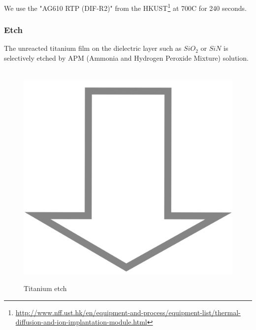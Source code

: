We use the "AG610 RTP (DIF-R2)" from the HKUST\footnote{\url{http://www.nff.ust.hk/en/equipment-and-process/equipment-list/thermal-diffusion-and-ion-implantation-module.html}} at 700\degree C for 240 seconds.

\subsubsection{Etch}

The unreacted titanium film on the dielectric layer such as $SiO_2$ or $SiN$ is selectively etched by APM (Ammonia and Hydrogen Peroxide Mixture) solution.

\begin{figure}[H]
	\centering
	\begin{tikzpicture}[node distance = 3cm, auto, thick,scale=\CrossSectionOnly, every node/.style={transform shape}]
		
	\end{tikzpicture}\\
	\includegraphics[scale=0.01]{down_arrow.png}\\
	\begin{tikzpicture}[node distance = 3cm, auto, thick,scale=\CrossSectionOnly, every node/.style={transform shape}]
		
	\end{tikzpicture}
	\caption{Titanium etch}
\end{figure}

